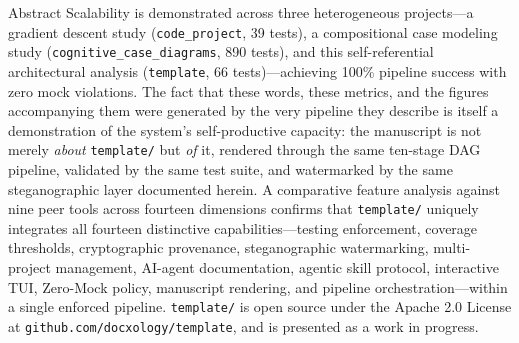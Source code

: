 \documentclass[
  ignorenonframetext,
]{beamer}
\begin{document}
\begin{frame}[fragile]{Abstract}
Scalability is demonstrated across three heterogeneous projects---a
gradient descent study (\texttt{code\_project}, 39 tests), a
compositional case modeling study (\texttt{cognitive\_case\_diagrams},
890 tests), and this self-referential architectural analysis
(\texttt{template}, 66 tests)---achieving 100\% pipeline success with
zero mock violations. The fact that these words, these metrics, and the
figures accompanying them were generated by the very pipeline they
describe is itself a demonstration of the system's self-productive
capacity: the manuscript is not merely \emph{about} \texttt{template/}
but \emph{of} it, rendered through the same ten-stage DAG pipeline,
validated by the same test suite, and watermarked by the same
steganographic layer documented herein. A comparative feature analysis
against nine peer tools across fourteen dimensions confirms that
\texttt{template/} uniquely integrates all fourteen distinctive
capabilities---testing enforcement, coverage thresholds, cryptographic
provenance, steganographic watermarking, multi-project management,
AI-agent documentation, agentic skill protocol, interactive TUI,
Zero-Mock policy, manuscript rendering, and pipeline
orchestration---within a single enforced pipeline. \texttt{template/} is
open source under the Apache 2.0 License at
\texttt{github.com/docxology/template}, and is presented as a work in
progress.~
\end{frame}
\end{document}
